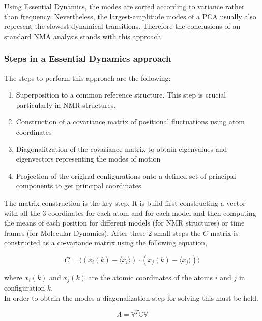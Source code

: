 \documentclass[12pt]{article}
\begin{document}
Using Essential Dynamics, the modes are sorted according to variance rather than frequency. Nevertheless, the largest-amplitude modes of a PCA usually also represent the slowest dynamical transitions. Therefore the conclusions of an standard NMA analysis stands with this approach.\citep{Hayward2008}\\

\subsubsection{Steps in a Essential Dynamics approach}
The steps to perform this approach are the following:

\begin{enumerate} [i]
\item Superposition to a common reference structure. This step is crucial particularly in NMR structures.
\item Construction of a covariance matrix of positional fluctuations using atom coordinates
\item Diagonalitzation of the covariance matrix to obtain eigenvalues and eigenvectors representing the modes of motion
\item Projection of the original configurations onto a defined set of principal components to get principal coordinates. 
\end{enumerate}

The matrix construction is the key step. It is build first constructing a vector with all the 3 coordinates for each atom and for each model and then computing the means of each position for different models (for NMR structures) or time frames (for Molecular Dynamics). After these 2 small steps the $C$ matrix is constructed as a co-variance matrix using the following equation,

\begin{equation}
C = \langle(x_{i}(k) - \langle x_{i}\rangle ) \cdot (x_{j}(k) - \langle x_{j}\rangle )\rangle
\end{equation}

where $x_{i}(k)$ and $x_{j}(k)$ are the atomic coordinates of the atoms $i$ and $j$ in
configuration $k$\citep{Amadei1993,Gargallo2003}.\\ 

In order to obtain the modes a diagonalization step for solving this must be held.

\begin{equation}
\Lambda = \mathbb{V}^{T} \mathbb{C} \mathbb{V}
\end{equation}
\end{document}
